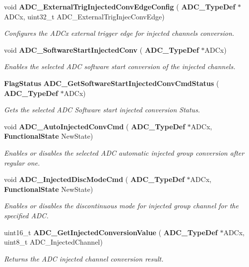 \begin{DoxyCompactItemize}
void \textbf{ A\+D\+C\+\_\+\+External\+Trig\+Injected\+Conv\+Edge\+Config} (\textbf{ A\+D\+C\+\_\+\+Type\+Def} $\ast$A\+D\+Cx, uint32\+\_\+t A\+D\+C\+\_\+\+External\+Trig\+Injec\+Conv\+Edge)
\begin{DoxyCompactList}\small\item\em Configures the A\+D\+Cx external trigger edge for injected channels conversion. \end{DoxyCompactList}\item 
void \textbf{ A\+D\+C\+\_\+\+Software\+Start\+Injected\+Conv} (\textbf{ A\+D\+C\+\_\+\+Type\+Def} $\ast$A\+D\+Cx)
\begin{DoxyCompactList}\small\item\em Enables the selected A\+DC software start conversion of the injected channels. \end{DoxyCompactList}\item 
\textbf{ Flag\+Status} \textbf{ A\+D\+C\+\_\+\+Get\+Software\+Start\+Injected\+Conv\+Cmd\+Status} (\textbf{ A\+D\+C\+\_\+\+Type\+Def} $\ast$A\+D\+Cx)
\begin{DoxyCompactList}\small\item\em Gets the selected A\+DC Software start injected conversion Status. \end{DoxyCompactList}\item 
void \textbf{ A\+D\+C\+\_\+\+Auto\+Injected\+Conv\+Cmd} (\textbf{ A\+D\+C\+\_\+\+Type\+Def} $\ast$A\+D\+Cx, \textbf{ Functional\+State} New\+State)
\begin{DoxyCompactList}\small\item\em Enables or disables the selected A\+DC automatic injected group conversion after regular one. \end{DoxyCompactList}\item 
void \textbf{ A\+D\+C\+\_\+\+Injected\+Disc\+Mode\+Cmd} (\textbf{ A\+D\+C\+\_\+\+Type\+Def} $\ast$A\+D\+Cx, \textbf{ Functional\+State} New\+State)
\begin{DoxyCompactList}\small\item\em Enables or disables the discontinuous mode for injected group channel for the specified A\+DC. \end{DoxyCompactList}\item 
uint16\+\_\+t \textbf{ A\+D\+C\+\_\+\+Get\+Injected\+Conversion\+Value} (\textbf{ A\+D\+C\+\_\+\+Type\+Def} $\ast$A\+D\+Cx, uint8\+\_\+t A\+D\+C\+\_\+\+Injected\+Channel)
\begin{DoxyCompactList}\small\item\em Returns the A\+DC injected channel conversion result. \end{DoxyCompactList}\end{DoxyCompactItemize}


